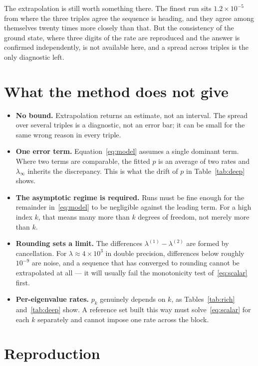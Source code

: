 \documentclass[11pt,a4paper]{article}
\begin{document}
The extrapolation is still worth something there. The finest run sits
$1.2 \times 10^{-5}$ from where the three triples agree the sequence is heading,
and they agree among themselves twenty times more closely than that. But the
consistency of the ground state, where three digits of the rate are reproduced
and the answer is confirmed independently, is not available here, and a spread
across triples is the only diagnostic left.

\section{What the method does not give}

\begin{itemize}
  \item \textbf{No bound.} Extrapolation returns an estimate, not an interval.
        The spread over several triples is a diagnostic, not an error bar; it
        can be small for the same wrong reason in every triple.
  \item \textbf{One error term.} Equation~\eqref{eq:model} assumes a single
        dominant term. Where two terms are comparable, the fitted $p$ is an
        average of two rates and $\lambda_\infty$ inherits the discrepancy. This
        is what the drift of $p$ in Table~\ref{tab:deep} shows.
  \item \textbf{The asymptotic regime is required.} Runs must be fine enough for
        the remainder in~\eqref{eq:model} to be negligible against the leading
        term. For a high index $k$, that means many more than $k$ degrees of
        freedom, not merely more than $k$.
  \item \textbf{Rounding sets a limit.} The differences
        $\lambda^{(1)} - \lambda^{(2)}$ are formed by cancellation. For
        $\lambda \approx 4 \times 10^{3}$ in double precision, differences below
        roughly $10^{-9}$ are noise, and a sequence that has converged to
        rounding cannot be extrapolated at all --- it will usually fail the
        monotonicity test of~\eqref{eq:scalar} first.
  \item \textbf{Per-eigenvalue rates.} $p_k$ genuinely depends on $k$, as
        Tables~\ref{tab:rich} and~\ref{tab:deep} show. A reference set built this
        way must solve~\eqref{eq:scalar} for each $k$ separately and cannot
        impose one rate across the block.
\end{itemize}

\section{Reproduction}
\end{document}

